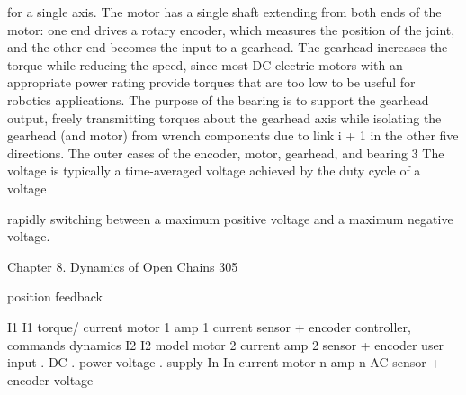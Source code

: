 \documentclass[12pt,a4paper]{article}
\begin{document}
for a single axis. The motor has a single shaft extending from both ends of
the motor: one end drives a rotary encoder, which measures the position of
the joint, and the other end becomes the input to a gearhead. The gearhead
increases the torque while reducing the speed, since most DC electric motors
with an appropriate power rating provide torques that are too low to be useful
for robotics applications. The purpose of the bearing is to support the gearhead
output, freely transmitting torques about the gearhead axis while isolating the
gearhead (and motor) from wrench components due to link i + 1 in the other
five directions. The outer cases of the encoder, motor, gearhead, and bearing
   3 The voltage is typically a time-averaged voltage achieved by the duty cycle of a voltage

rapidly switching between a maximum positive voltage and a maximum negative voltage.


Chapter 8. Dynamics of Open Chains                                                                  305

                                             position feedback

                                                              I1                 I1
                    torque/                                         current            motor 1
                                                 amp 1
                     current                                         sensor           + encoder
  controller,      commands
  dynamics
                                                              I2                 I2
    model                                                                              motor 2
                                                                    current
                                                 amp 2
                                                                     sensor           + encoder
  user input
                                                                      .
                       DC                                             .
    power            voltage                                          .
    supply
                                                              In                In
                                                                    current            motor n
                                                 amp n
      AC                                                             sensor           + encoder
    voltage
\end{document}
